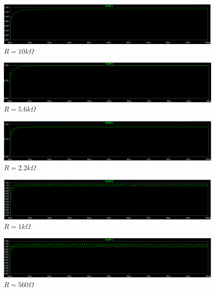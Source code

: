\begin{figure}[H]
    \begin{center}
    \includegraphics[scale=0.25]{images/LTSPICE/2.png}
    \caption{$R=10k\Omega$}
    \end{center}
\end{figure}

\begin{figure}[H]
    \begin{center}
    \includegraphics[scale=0.25]{images/LTSPICE/3.png}
    \caption{$R=5.6k\Omega$}
    \end{center}
\end{figure}

\begin{figure}[H]
    \begin{center}
    \includegraphics[scale=0.25]{images/LTSPICE/4.png}
    \caption{$R=2.2k\Omega$}
    \end{center}
\end{figure}

\begin{figure}[H]
    \begin{center}
    \includegraphics[scale=0.25]{images/LTSPICE/5.png}
    \caption{$R=1k\Omega$}
    \end{center}
\end{figure}

\begin{figure}[H]
    \begin{center}
    \includegraphics[scale=0.25]{images/LTSPICE/6.png}
    \caption{$R=560\Omega$}
    \end{center}
\end{figure}

